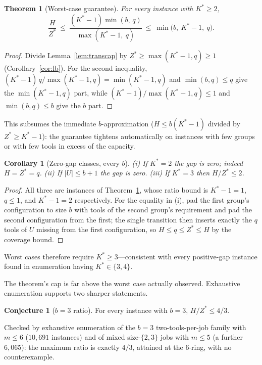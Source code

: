 \documentclass[11pt,a4paper]{article}
\theoremstyle{plain}
\newtheorem{theorem}{Theorem}
\newtheorem{corollary}{Corollary}
\theoremstyle{definition}
\newtheorem{conjecture}{Conjecture}
\theoremstyle{remark}
\newcommand{\U}{U}
\newcommand{\Kst}{K^{\ast}}
\newcommand{\Zst}{Z^{\ast}}
\begin{document}
\begin{theorem}[Worst-case guarantee]\label{thm:uncond}
For every instance with $\Kst\ge2$,
\[
  \frac{H}{\Zst}\ \le\ \frac{(\Kst-1)\min(b,\,q)}{\max(\Kst-1,\ q)}
  \ \le\ \min\bigl(b,\ \Kst-1,\ q\bigr).
\]
\end{theorem}
\begin{proof}
Divide Lemma~\ref{lem:transcap} by $\Zst\ge\max(\Kst-1,q)\ge1$
(Corollary~\ref{cor:lb}). For the second inequality,
$(\Kst-1)\,q/\max(\Kst-1,q)=\min(\Kst-1,q)$ and $\min(b,q)\le q$ give the
$\min(\Kst-1,q)$ part, while $(\Kst-1)/\max(\Kst-1,q)\le1$ and $\min(b,q)\le b$
give the $b$ part.
\end{proof}
\noindent This subsumes the immediate $b$-approximation ($H\le b(\Kst-1)$ divided
by $\Zst\ge\Kst-1$): the guarantee tightens automatically on instances with few
groups or with few tools in excess of the capacity.

\begin{corollary}[Zero-gap classes, every $b$]\label{cor:zerogap}
(i) If $\Kst=2$ the gap is zero; indeed $H=\Zst=q$. (ii) If $\lvert\U\rvert\le b+1$
the gap is zero. (iii) If $\Kst=3$ then $H/\Zst\le2$.
\end{corollary}
\begin{proof}
All three are instances of Theorem~\ref{thm:uncond}, whose ratio bound is
$\Kst-1=1$, $q\le1$, and $\Kst-1=2$ respectively. For the equality in (i), pad the
first group's configuration to size $b$ with tools of the second group's
requirement and pad the second configuration from the first; the single transition
then inserts exactly the $q$ tools of $\U$ missing from the first configuration, so
$H\le q\le\Zst\le H$ by the coverage bound.
\end{proof}
\noindent Worst cases therefore require $\Kst\ge3$---consistent with every
positive-gap instance found in enumeration having $\Kst\in\{3,4\}$.

The theorem's cap is far above the worst case actually observed. Exhaustive
enumeration supports two sharper statements.
\begin{conjecture}[$b=3$ ratio]\label{conj:43}
For every instance with $b=3$, $H/\Zst\le 4/3$.
\end{conjecture}
\noindent Checked by exhaustive enumeration of the $b=3$ two-tools-per-job family
with $m\le6$ ($10{,}691$ instances) and of mixed size-$\{2,3\}$ jobs with $m\le5$ (a
further $6{,}065$): the maximum ratio is exactly $4/3$, attained at the
$6$-ring, with no counterexample.
\end{document}
